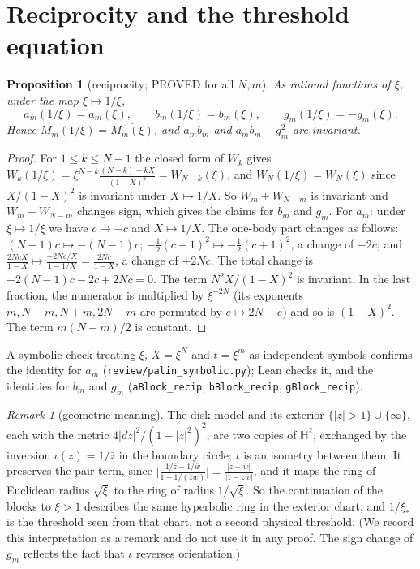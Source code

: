 \documentclass[11pt]{article}
\newtheorem{proposition}[theorem]{Proposition}
\theoremstyle{remark}
\newtheorem{remark}[theorem]{Remark}
\begin{document}
\section{Reciprocity and the threshold equation}\label{sec:recip}
\begin{proposition}[reciprocity; PROVED for all $N,m$]\label{prop:recip}
As rational functions of $\xi$, under the map $\xi\mapsto1/\xi$,
\[
a_m(1/\xi)=a_m(\xi),\qquad b_m(1/\xi)=b_m(\xi),\qquad g_m(1/\xi)=-g_m(\xi).
\]
Hence $M_m(1/\xi)=\overline{M_m(\xi)}$, and $a_mb_m$ and $a_mb_m-g_m^2$ are invariant.
\end{proposition}
\begin{proof}
For $1\le k\le N-1$ the closed form of $W_k$ gives
$W_k(1/\xi)=\xi^{N-k}\frac{(N-k)+kX}{(1-X)^2}=W_{N-k}(\xi)$, and $W_N(1/\xi)=W_N(\xi)$ since $X/(1-X)^2$ is invariant under
$X\mapsto1/X$. So $W_m+W_{N-m}$ is invariant and $W_m-W_{N-m}$ changes sign, which gives the claims for $b_m$ and $g_m$.
For $a_m$: under $\xi\mapsto1/\xi$ we have $c\mapsto-c$ and $X\mapsto1/X$. The one-body part changes as follows:
$(N-1)c\mapsto-(N-1)c$; $-\frac12(c-1)^2\mapsto-\frac12(c+1)^2$, a change of $-2c$; and
$\frac{2NcX}{1-X}\mapsto\frac{-2Nc/X}{1-1/X}=\frac{2Nc}{1-X}$, a change of $+2Nc$. The total change is
$-2(N-1)c-2c+2Nc=0$. The term $N^2X/(1-X)^2$ is invariant. In the last fraction, the numerator is multiplied by
$\xi^{-2N}$ (its exponents $m,N-m,N+m,2N-m$ are permuted by $e\mapsto2N-e$) and so is $(1-X)^2$. The term
$m(N-m)/2$ is constant.
\end{proof}
A symbolic check treating $\xi$, $X=\xi^N$ and $t=\xi^m$ as independent symbols confirms the identity for $a_m$
(\texttt{review/palin\_symbolic.py}); Lean checks it, and the identities for $b_m$ and $g_m$ (\texttt{aBlock\_recip}, \texttt{bBlock\_recip}, \texttt{gBlock\_recip}).

\begin{remark}[geometric meaning]
The disk model and its exterior $\{|z|>1\}\cup\{\infty\}$, each with the metric $4|dz|^2/(1-|z|^2)^2$, are two copies of
$\mathbb H^2$, exchanged by the inversion $\iota(z)=1/\bar z$ in the boundary circle; $\iota$ is an isometry between them. It
preserves the pair term, since $\big|\frac{1/\bar z-1/\bar w}{1-1/(\bar z w)}\big|=\frac{|z-w|}{|1-z\bar w|}$, and it maps the
ring of Euclidean radius $\sqrt\xi$ to the ring of radius $1/\sqrt\xi$. So the continuation of the blocks to $\xi>1$
describes the same hyperbolic ring in the exterior chart, and $1/\xi_*$ is the threshold seen from that chart, not a
second physical threshold. (We record this interpretation as a remark and do not use it in any proof. The sign change of $g_m$ reflects the fact that $\iota$ reverses
orientation.)
\end{remark}
\end{document}
